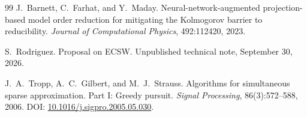 \documentclass[a4paper,12pt]{article}
\begin{document}
\begin{thebibliography}{99}
J.~Barnett, C.~Farhat, and Y.~Maday.
Neural-network-augmented projection-based model order reduction for mitigating the Kolmogorov barrier to reducibility.
\textit{Journal of Computational Physics}, 492:112420, 2023.

S.~Rodriguez.
Proposal on ECSW.
Unpublished technical note, September 30, 2026.

J.~A.~Tropp, A.~C.~Gilbert, and M.~J.~Strauss.
Algorithms for simultaneous sparse approximation. Part I: Greedy pursuit.
\textit{Signal Processing}, 86(3):572--588, 2006.
DOI: \href{https://doi.org/10.1016/j.sigpro.2005.05.030}{10.1016/j.sigpro.2005.05.030}.

\end{thebibliography}
\end{document}
